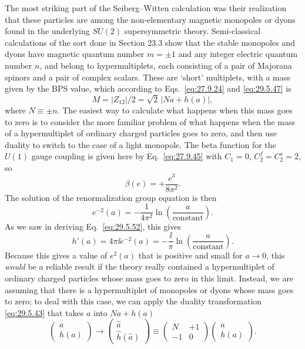 The most striking part of the Seiberg--Witten calculation was their
realization that these particles are among the non-elementary magnetic
monopoles or dyons found in the underlying \(SU(2)\) supersymmetric theory.
Semi-classical calculations of the sort done in Section 23.3 show that the
stable monopoles and dyons have magnetic quantum number \(m=\pm1\) and any
integer electric quantum number \(n\), and belong to hypermultiplets, each
consisting of a pair of Majorana spinors and a pair of complex scalars.
These are `short' multiplets, with a mass given by the BPS value, which
according to Eqs.~\eqref{eq:27.9.24} and \eqref{eq:29.5.47} is
\begin{equation}
  M=\lvert Z_{12}\rvert/2
  =\sqrt{2}\,\lvert Na+h(a)\rvert,
  \tag{29.5.58}\label{eq:29.5.58}
\end{equation}
where \(N\equiv\pm n\). The easiest way to calculate what happens when this
mass goes to zero is to consider the more familiar problem of what happens
when the mass of a hypermultiplet of ordinary charged particles goes to
zero, and then use duality to switch to the case of a light monopole. The
beta function for the \(U(1)\) gauge coupling is given here by
Eq.~\eqref{eq:27.9.45} with \(C_1=0\), \(C_2^f=C_2^s=2\), so
\[
  \beta(e)=+\frac{e^3}{8\pi^2}.
\]
The solution of the renormalization group equation is then
\[
  e^{-2}(a)
  =-\frac{1}{4\pi^2}\ln\left(\frac{a}{\text{constant}}\right).
\]
As we saw in deriving Eq.~\eqref{eq:29.5.52}, this gives
\[
  h'(a)=4\pi \ii e^{-2}(a)
  =-\frac{\ii}{\pi}\ln\left(\frac{a}{\text{constant}}\right).
\]
Because this gives a value of \(e^2(a)\) that is positive and small for
\(a\longrightarrow0\), this \textit{would} be a reliable result if the
theory really contained a hypermultiplet of ordinary charged particles whose
mass goes to zero in this limit. Instead, we are assuming that there is a
hypermultiplet of monopoles or dyons whose mass goes to zero; to deal with
this case, we can apply the duality transformation \eqref{eq:29.5.43} that
takes \(a\) into \(Na+h(a)\)
\begin{equation}
  \begin{pmatrix}
    a\\ h(a)
  \end{pmatrix}
  \longrightarrow
  \begin{pmatrix}
    \widehat a\\ \widehat h(\widehat a)
  \end{pmatrix}
  \equiv
  \begin{pmatrix}
    N&+1\\ -1&0
  \end{pmatrix}
  \begin{pmatrix}
    a\\ h(a)
  \end{pmatrix}.
  \tag{29.5.59}\label{eq:29.5.59}
\end{equation}

